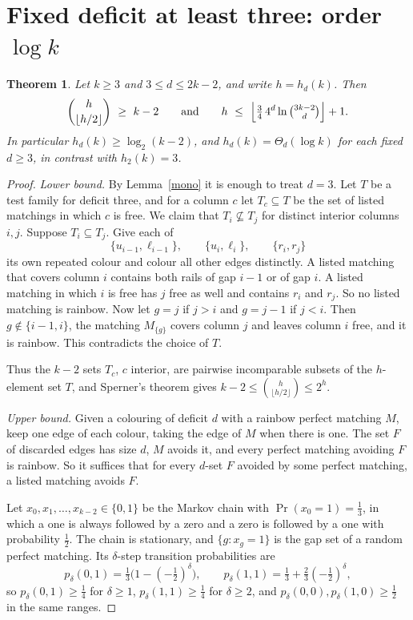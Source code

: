 \documentclass[11pt]{article}
\newtheorem{theorem}{Theorem}
\theoremstyle{remark}
\begin{document}
\section{Fixed deficit at least three: order \texorpdfstring{\(\log k\)}{log k}}
\begin{theorem}\label{log}
Let \(k\ge3\) and \(3\le d\le 2k-2\), and write \(h=h_d(k)\). Then
\[
  \binom{h}{\lfloor h/2\rfloor}\ \ge\ k-2
  \qquad\text{and}\qquad
  h\ \le\ \Bigl\lfloor \tfrac34\,4^{d}\ln\tbinom{3k-2}{d}\Bigr\rfloor+1 .
\]
In particular \(h_d(k)\ge\log_2(k-2)\), and \(h_d(k)=\Theta_d(\log k)\) for
each fixed \(d\ge3\), in contrast with \(h_2(k)=3\).
\end{theorem}
\begin{proof}
\emph{Lower bound.} By Lemma~\ref{mono} it is enough to treat \(d=3\). Let
\(T\) be a test family for deficit three, and for a column \(c\) let
\(T_c\subseteq T\) be the set of listed matchings in which \(c\) is free. We
claim that \(T_i\not\subseteq T_j\) for distinct interior columns \(i,j\).
Suppose \(T_i\subseteq T_j\). Give each of
\[
 \{u_{i-1},\ell_{i-1}\},\qquad\{u_i,\ell_i\},\qquad\{r_i,r_j\}
\]
its own repeated colour and colour all other edges distinctly. A listed
matching that covers column \(i\) contains both rails of gap \(i-1\) or of
gap \(i\). A listed matching in which \(i\) is free has \(j\) free as well and
contains \(r_i\) and \(r_j\). So no listed matching is rainbow. Now let
\(g=j\) if \(j>i\) and \(g=j-1\) if \(j<i\). Then \(g\notin\{i-1,i\}\), the
matching \(M_{\{g\}}\) covers column \(j\) and leaves column \(i\) free, and
it is rainbow. This contradicts the choice of \(T\).

Thus the \(k-2\) sets \(T_c\), \(c\) interior, are pairwise incomparable
subsets of the \(h\)-element set \(T\), and Sperner's theorem gives
\(k-2\le\binom{h}{\lfloor h/2\rfloor}\le 2^h\).

\emph{Upper bound.} Given a colouring of deficit \(d\) with a rainbow
perfect matching \(M\), keep one edge of each colour, taking the edge of
\(M\) when there is one. The set \(F\) of discarded edges has size \(d\),
\(M\) avoids it, and every perfect matching avoiding \(F\) is rainbow. So it
suffices that for every \(d\)-set \(F\) avoided by some perfect matching, a
listed matching avoids \(F\).

Let \(x_0,x_1,\dots,x_{k-2}\in\{0,1\}\) be the Markov chain with
\(\Pr(x_0=1)=\tfrac13\), in which a one is always followed by a zero and a
zero is followed by a one with probability \(\tfrac12\). The chain is
stationary, and \(\{g:x_g=1\}\) is the gap set of a random perfect matching.
Its \(\delta\)-step transition probabilities are
\[
 p_\delta(0,1)=\tfrac13\bigl(1-(-\tfrac12)^\delta\bigr),\qquad
 p_\delta(1,1)=\tfrac13+\tfrac23(-\tfrac12)^\delta ,
\]
so \(p_\delta(0,1)\ge\tfrac14\) for \(\delta\ge1\), \(p_\delta(1,1)\ge\tfrac14\)
for \(\delta\ge2\), and \(p_\delta(0,0),p_\delta(1,0)\ge\tfrac12\) in the
same ranges.


\end{proof}
\end{document}
